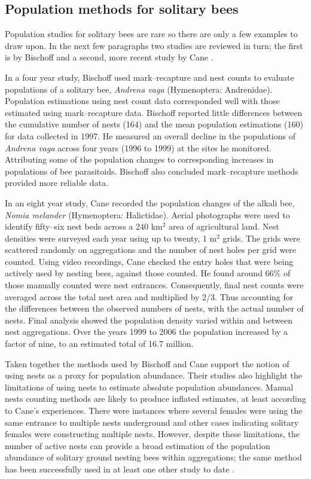 \subsection{Population methods for solitary bees}\label{sec:population-methods-for-solitary-bees}
Population studies for solitary bees are rare so there are only a few examples to draw upon. In the next few paragraphs two studies are reviewed in turn; the first is by Bischoff \cite{Bischoff2003} and a second, more recent study by Cane \cite{Cane2008}.

In a four year study, Bischoff \cite{Bischoff2003} used mark--recapture and nest counts to evaluate populations of a solitary bee, \emph{Andrena vaga} (Hymenoptera: Andrenidae). Population estimations using nest count data corresponded well with those estimated using mark--recapture data. Bischoff \cite{Bischoff2003} reported little differences between the cumulative number of nests (164) and the mean population estimations (160) for data collected in 1997. He measured an overall decline in the populations of \emph{Andrena vaga} across four years (1996 to 1999) at the sites he monitored. Attributing some of the population changes to corresponding increases in populations of bee parasitoids. Bischoff \cite{Bischoff2003} also concluded mark--recapture methods provided more reliable data.

In an eight year study, Cane \cite{Cane2008} recorded the population changes of the alkali bee, \emph{Nomia melander} (Hymenoptera: Halictidae). Aerial photographs were used to identify fifty--six nest beds across a 240 km$^2$ area of agricultural land. Nest densities were surveyed each year using up to twenty, 1 m$^2$ grids. The grids were scattered randomly on aggregations and the number of nest holes per grid were counted.  Using video recordings, Cane \cite{Cane2008} checked the entry holes that were being actively used by nesting bees, against those counted. He found around 66\% of those manually counted were nest entrances. Consequently, final nest counts were averaged across the total nest area and multiplied by 2/3. Thus accounting for the differences between the observed numbers of nests, with the actual number of nests. Final analysis showed the population density varied within and between nest aggregations. Over the years 1999 to 2006 the population increased by a factor of nine, to an estimated total of 16.7 million.

Taken together the methods used by Bischoff \cite{Bischoff2003} and Cane \cite{Cane2008} support the notion of using nests as a proxy for population abundance. Their studies also highlight the limitations of using nests to estimate absolute population abundances. Manual nests counting methods are likely to produce inflated estimates, at least according to Cane's \cite{Cane2008} experiences. There were instances where several females were using the same entrance to multiple nests underground and other cases indicating solitary females were constructing multiple nests. However, despite these limitations, the number of active nests can provide a broad estimation of the population abundance of solitary ground nesting bees within aggregations; the same method has been successfully used in at least one other study to date \cite{Fellendorf2004}. 

